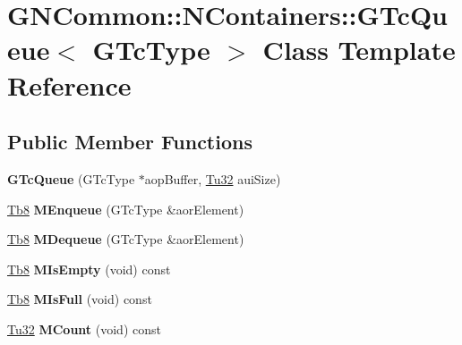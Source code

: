 \hypertarget{class_g_n_common_1_1_n_containers_1_1_g_tc_queue}{}\section{G\+N\+Common\+:\+:N\+Containers\+:\+:G\+Tc\+Queue$<$ G\+Tc\+Type $>$ Class Template Reference}
\label{class_g_n_common_1_1_n_containers_1_1_g_tc_queue}
\subsection*{Public Member Functions}
\begin{DoxyCompactItemize}
\item 
\mbox{\label{class_g_n_common_1_1_n_containers_1_1_g_tc_queue_aa64bd5892456166c0295ab054aa48839}} 
{\bfseries G\+Tc\+Queue} (G\+Tc\+Type $\ast$aop\+Buffer, \mbox{\hyperlink{namespace_g_n_common_a941b527ef318f318aed7903dc832b7e4}{Tu32}} aui\+Size)
\item 
\mbox{\label{class_g_n_common_1_1_n_containers_1_1_g_tc_queue_a52d28010867f8ed0159b4d87d339623e}} 
\mbox{\hyperlink{namespace_g_n_common_a8115dc7ed53b6e5b52e6bfde1632ea74}{Tb8}} {\bfseries M\+Enqueue} (G\+Tc\+Type \&aor\+Element)
\item 
\mbox{\label{class_g_n_common_1_1_n_containers_1_1_g_tc_queue_a830d2f2082375430e547e0b99300a141}} 
\mbox{\hyperlink{namespace_g_n_common_a8115dc7ed53b6e5b52e6bfde1632ea74}{Tb8}} {\bfseries M\+Dequeue} (G\+Tc\+Type \&aor\+Element)
\item 
\mbox{\label{class_g_n_common_1_1_n_containers_1_1_g_tc_queue_ae4c9865a672f3e48f7cd0eab79cc42e0}} 
\mbox{\hyperlink{namespace_g_n_common_a8115dc7ed53b6e5b52e6bfde1632ea74}{Tb8}} {\bfseries M\+Is\+Empty} (void) const
\item 
\mbox{\label{class_g_n_common_1_1_n_containers_1_1_g_tc_queue_a05c9cf6f2ae03fa910072560a4a19d28}} 
\mbox{\hyperlink{namespace_g_n_common_a8115dc7ed53b6e5b52e6bfde1632ea74}{Tb8}} {\bfseries M\+Is\+Full} (void) const
\item 
\mbox{\label{class_g_n_common_1_1_n_containers_1_1_g_tc_queue_a9cae400d846f0ed6263e743cd452311a}} 
\mbox{\hyperlink{namespace_g_n_common_a941b527ef318f318aed7903dc832b7e4}{Tu32}} {\bfseries M\+Count} (void) const
\end{DoxyCompactItemize}


